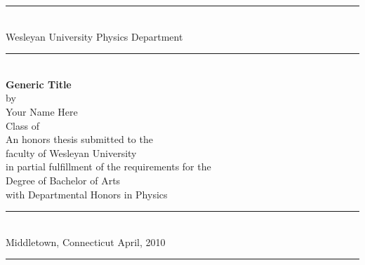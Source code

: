\documentclass[10pt,letterpaper, oneside]{book}
\newcommand{\conditionalblankpage}{\cleardoublepage}  %
\begin{document}




\pagestyle{empty} 
\begin{titlepage}
\begin{center}
\rule{5.75in}{1pt} \\
\vspace*{-0.125in}
{\large Wesleyan University} \hfill {\large Physics Department}
\rule[0.2in]{5.75in}{1pt} \\
\vspace*{1.1in}
{\LARGE \bf Generic Title} \\					%
\vspace*{0.05in}
\vspace*{0.25in}
{\Large by \\ \vspace*{0.10in}  Your Name Here\\ Class of \\}  %
\vspace*{1.25in}
{\large An honors thesis submitted to the\\ faculty of Wesleyan University\\ in partial fulfillment of the requirements for the \\Degree of Bachelor of Arts \\ with Departmental Honors in Physics \vspace*{-0.15in} }\vspace*{.25in}
\rule{5.75in}{1pt} \\
\vspace*{-0.125in}
{\large Middletown, Connecticut \hfill April, 2010}		%
\rule[0.2in]{5.75in}{1pt} \\
\end{center}
\end{titlepage}



\tableofcontents
\listoffigures 
\conditionalblankpage
\pagestyle{fancy}
\fancyhead{}
\renewcommand{\chaptermark}[1]{\markboth{Chapter \thechapter\;- #1  }{}} 
\renewcommand{\sectionmark}[1]{\markright{Section \thesection #1}{}} 
\fancyfoot[C]{} 
\fancyhead[LE]{\leftmark}   %
\fancyhead[RE]{\thepage}   %
\fancyhead[LO]{\rightmark}   %
\fancyhead[RO]{\thepage}  %



\pagestyle{empty}\pagestyle{fancy} %

\renewcommand{\chaptermark}[1]{ \markboth{\appendixname \ \thechapter.\ #1}{}} 
\fancyhead[LO]{\leftmark}   %



\end{document}
